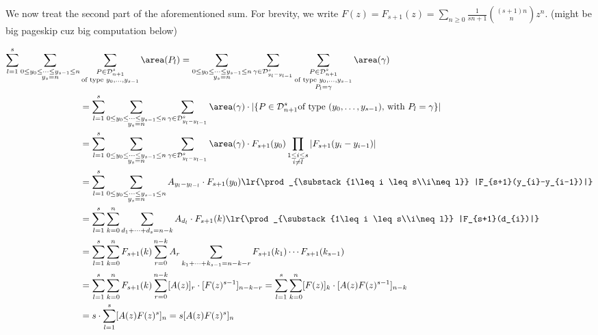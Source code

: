 \documentclass[12pt]{article}
\begin{document}
We now treat the second part of the aforementioned sum. For brevity, we write $ F(z) = F_{s+1}(z) = \sum_{n\geq0}\frac{1}{sn+1}\binom{(s+1)n}{n}z^{n} $. (might be big pageskip cuz big computation below)

\begin{align*}
    \sum_{l=1}^{s}\sum_{\substack{0\leq y_{0}\leq \cdots\leq y_{s-1}\leq n\\y_{s}=n}}& \sum_{\substack{P\in \mathcal{D}_{n+1}^{s}\\\text{of type }y_{0},\ldots, y_{s-1}}} \area(P_{l}) = \sum_{\substack{0\leq y_{0}\leq \cdots\leq y_{s-1}\leq n\\y_{s}=n}}\sum_{\gamma\in \mathcal{D}_{y_{l}-y_{l-1}}^{s}} \sum_{\substack{P\in \mathcal{D}_{n+1}^{s}\\\text{of type }y_{0},\ldots, y_{s-1}\\P_{l}=\gamma}} \area(\gamma)\\
    &=\sum_{l=1}^{s} \sum_{\substack{0\leq y_{0}\leq \cdots\leq y_{s-1}\leq n\\y_{s}=n}}\sum_{\gamma\in \mathcal{D}_{y_{l}-y_{l-1}}^{s}} \area(\gamma)\cdot|\{P\in \mathcal{D}_{n+1}^{s} \text{of type }(y_{0},\ldots, y_{s-1}),\,\text{with } P_{l}=\gamma\}|  \\
    &=\sum_{l=1}^{s} \sum_{\substack{0\leq y_{0}\leq \cdots\leq y_{s-1}\leq n\\y_{s}=n}}\sum_{\gamma\in \mathcal{D}_{y_{l}-y_{l-1}}^{s}}  \area(\gamma)\cdot F_{s+1}(y_{0})\prod_{\substack{1\leq i \leq s\\i\neq l}} |F_{s+1}(y_{i}-y_{i-1})| \\
    &= \sum_{l=1}^{s} \sum_{\substack{0\leq y_{0}\leq \cdots\leq y_{s-1}\leq n\\y_{s}=n}}A_{y_{l}-y_{l-l}} \cdot F_{s+1}(y_{0}) \lr{\prod_{\substack{1\leq i \leq s\\i\neq l}} |F_{s+1}(y_{i}-y_{i-1})|} \\
    &= \sum_{l=1}^{s} \sum_{k=0}^{n}\sum_{d_{1}+\cdots+d_{s} = n-k}A_{d_{l}} \cdot F_{s+1}(k) \lr{\prod_{\substack{1\leq i \leq s\\i\neq l}} |F_{s+1}(d_{i})|} \\
    &= \sum_{l=1}^{s} \sum_{k=0}^{n}F_{s+1}(k)\sum_{r=0}^{n-k}A_{r}\sum_{k_{1}+\cdots+k_{s-1} = n-k-r}  F_{s+1}(k_{1})\cdots F_{s+1}(k_{s-1}) \\
    &= \sum_{l=1}^{s} \sum_{k=0}^{n}F_{s+1}(k)\sum_{r=0}^{n-k}[A(z)]_{r}\cdot[F(z)^{s-1}]_{n-k-r} = \sum_{l=1}^{s} \sum_{k=0}^{n}[F(z)]_{k}\cdot[A(z)F(z)^{s-1}]_{n-k} \\
    &=s\cdot\sum_{l=1}^{s}[A(z)F(z)^{s}]_{n} = s[A(z)F(z)^{s}]_{n}
\end{align*}
\end{document}
